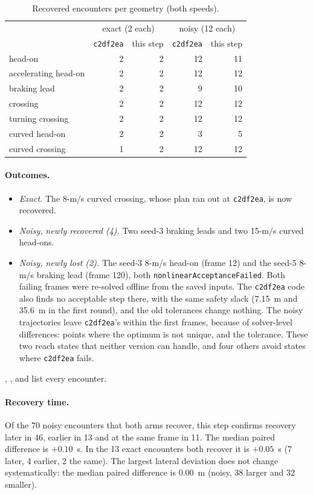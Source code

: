 \documentclass[11pt]{article}
\begin{document}
\begin{table}[h]
\centering\small
\caption{Recovered encounters per geometry (both speeds).}
\begin{tabular}{lrrrr}
\toprule
 & \multicolumn{2}{c}{exact (2 each)} & \multicolumn{2}{c}{noisy (12 each)}\\
 & \texttt{c2df2ea} & this step & \texttt{c2df2ea} & this step\\
\midrule
head-on & 2 & 2 & 12 & 11\\
accelerating head-on & 2 & 2 & 12 & 12\\
braking lead & 2 & 2 & 9 & 10\\
crossing & 2 & 2 & 12 & 12\\
turning crossing & 2 & 2 & 12 & 12\\
curved head-on & 2 & 2 & 3 & 5\\
curved crossing & 1 & 2 & 12 & 12\\
\bottomrule
\end{tabular}
\end{table}

\paragraph{Outcomes.}
\begin{itemize}
\item \emph{Exact.} The 8-m/s curved crossing, whose plan ran out at
  \texttt{c2df2ea}, is now recovered.
\item \emph{Noisy, newly recovered (4).} Two seed-3 braking leads and two
  15-m/s curved head-ons.
\item \emph{Noisy, newly lost (2).} The seed-3 8-m/s head-on (frame 12)
  and the seed-5 8-m/s braking lead (frame 120), both
  \texttt{nonlinearAcceptanceFailed}. Both failing frames were re-solved
  offline from the saved inputs. The \texttt{c2df2ea} code also finds no
  acceptable step there, with the same safety slack (7.15~m and 35.6~m in
  the first round), and the old tolerances change nothing. The noisy
  trajectories leave \texttt{c2df2ea}'s within the first frames, because of
  solver-level differences: points where the optimum is not unique, and the
  tolerance. These two reach states that neither version can handle, and
  four others avoid states where \texttt{c2df2ea} fails.
\end{itemize}
, ,  and
 list every encounter.

\paragraph{Recovery time.}
Of the 70 noisy encounters that both arms recover, this step confirms
recovery later in 46, earlier in 13 and at the same frame in 11. The median
paired difference is $+0.10$~s. In the 13 exact encounters both recover it
is $+0.05$~s (7 later, 4 earlier, 2 the same). The largest lateral
deviation does not change systematically: the median paired difference is
0.00~m (noisy, 38 larger and 32 smaller).
\end{document}
